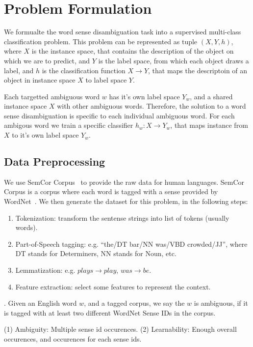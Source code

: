 \section{Problem Formulation}

We formualte the word sense disambiguation task into a supervised multi-class
classification problem.
This problem can be represented as tuple $(X,Y,h)$, where $X$ is the instance
space, that contains the description of the object on which we are to predict, 
and $Y$ is the label space, from which each object draws a label,
and $h$ is the classification function $X \rightarrow Y$, that maps the
descriptoin of an object in instance space $X$ to label space $Y$.

Each targetted ambiguous word $w$ has it's own label space $Y_w$, and a shared
instance space $X$ with other ambiguous words.
Therefore, the solution to a word sense disambiguation is specific to each
individual ambiguous word.
For each ambigous word we train a specific classifier $h_w: X
\rightarrow Y_w$, that maps instance from $X$ to it's own label space $Y_w$.


\subsection{Data Preprocessing}

We use SemCor Corpus~\cite{semcor} to provide the raw data for human languages.
SemCor Corpus is a corpus where each word is tagged with a sense provided by
WordNet~\cite{wordnet}.
We then generate the dataset for this problem, in the following steps:

\begin{enumerate}
  \item Tokenization: transform the sentense strings into list of tokens
    (usually words).
  \item Part-of-Speech tagging: e.g. ``the/DT bar/NN was/VBD crowded/JJ'', where
    DT stands for Determiners, NN stands for Noun, etc.
  \item Lemmatization: e.g. $plays \rightarrow play$, $was \rightarrow be$.
  \item Feature extraction: select some features to represent the context.
\end{enumerate}

. 
Given an English word $w$, and a tagged corpus, we say the $w$ is ambiguous, if
it is tagged with at least two different WordNet Sense IDs in the corpus.

(1) Ambiguity: Multiple sense id occurences.
(2) Learnability: Enough overall occurences, and occurences for each sense ids.

